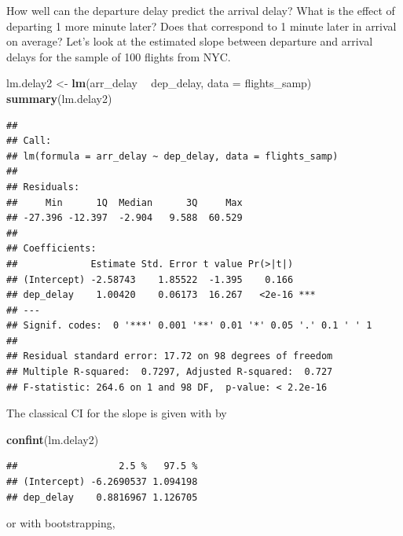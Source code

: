 \documentclass[
]{book}
\newenvironment{Shaded}{\begin{snugshade}}{\end{snugshade}}
\newcommand{\DataTypeTok}[1]{\textcolor[rgb]{0.13,0.29,0.53}{#1}}
\newcommand{\KeywordTok}[1]{\textcolor[rgb]{0.13,0.29,0.53}{\textbf{#1}}}
\newcommand{\NormalTok}[1]{#1}
\newcommand{\OperatorTok}[1]{\textcolor[rgb]{0.81,0.36,0.00}{\textbf{#1}}}
\newcommand{\StringTok}[1]{\textcolor[rgb]{0.31,0.60,0.02}{#1}}
\begin{document}
How well can the departure delay predict the arrival delay? What is the effect of departing 1 more minute later? Does that correspond to 1 minute later in arrival on average? Let's look at the estimated slope between departure and arrival delays for the sample of 100 flights from NYC.

\begin{Shaded}
\begin{Highlighting}[]
\NormalTok{lm.delay2 <-}\StringTok{ }\KeywordTok{lm}\NormalTok{(arr_delay }\OperatorTok{~}\StringTok{ }\NormalTok{dep_delay, }\DataTypeTok{data =}\NormalTok{ flights_samp)}
\KeywordTok{summary}\NormalTok{(lm.delay2)}
\end{Highlighting}
\end{Shaded}

\begin{verbatim}
## 
## Call:
## lm(formula = arr_delay ~ dep_delay, data = flights_samp)
## 
## Residuals:
##     Min      1Q  Median      3Q     Max 
## -27.396 -12.397  -2.904   9.588  60.529 
## 
## Coefficients:
##             Estimate Std. Error t value Pr(>|t|)    
## (Intercept) -2.58743    1.85522  -1.395    0.166    
## dep_delay    1.00420    0.06173  16.267   <2e-16 ***
## ---
## Signif. codes:  0 '***' 0.001 '**' 0.01 '*' 0.05 '.' 0.1 ' ' 1
## 
## Residual standard error: 17.72 on 98 degrees of freedom
## Multiple R-squared:  0.7297,	Adjusted R-squared:  0.727 
## F-statistic: 264.6 on 1 and 98 DF,  p-value: < 2.2e-16
\end{verbatim}

The classical CI for the slope is given with by

\begin{Shaded}
\begin{Highlighting}[]
\KeywordTok{confint}\NormalTok{(lm.delay2)}
\end{Highlighting}
\end{Shaded}

\begin{verbatim}
##                  2.5 %   97.5 %
## (Intercept) -6.2690537 1.094198
## dep_delay    0.8816967 1.126705
\end{verbatim}

or with bootstrapping,
\end{document}
